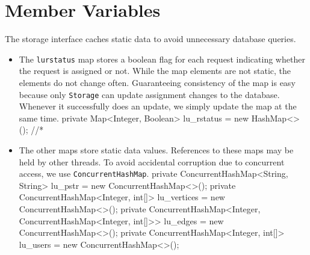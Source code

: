\section{Member Variables}
The storage interface caches static data to avoid unnecessary database queries.
\begin{itemize}
\item The {\tt{}lu{}rstatus} map stores a boolean flag for each request indicating
whether the request is assigned or not. While the map elements are not static,
the elements do not change often. Guaranteeing consistency of the map is easy
because only {\tt{}Storage} can update assignment changes to the database.
Whenever it successfully does an update, we simply update the map at the same
time.
\nwenddocs{}\endmoddef{}
private Map<Integer, Boolean> lu_rstatus = new HashMap<>();  //*
\nwendcode{}\nwdocspar
\item The other maps store static data values. References to these maps may be
held by other threads. To avoid accidental corruption due to concurrent access,
we use {\tt{}ConcurrentHashMap}.
\nwenddocs{}\plusendmoddef
private ConcurrentHashMap<String, String> lu_pstr     = new ConcurrentHashMap<>();
private ConcurrentHashMap<Integer, int[]> lu_vertices = new ConcurrentHashMap<>();
private ConcurrentHashMap<Integer,
    ConcurrentHashMap<Integer, int[]>>    lu_edges    = new ConcurrentHashMap<>();
private ConcurrentHashMap<Integer, int[]> lu_users    = new ConcurrentHashMap<>();
\nwendcode{}\nwdocspar
\end{itemize}

